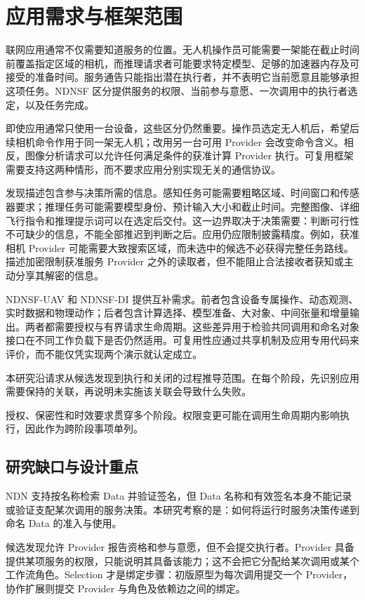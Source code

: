 \section{应用需求与框架范围}
联网应用通常不仅需要知道服务的位置。无人机操作员可能需要一架能在截止时间前覆盖指定区域的相机，而推理请求者可能要求特定模型、足够的加速器内存及可接受的准备时间。服务通告只能指出潜在执行者，并不表明它当前愿意且能够承担这项任务。NDNSF 区分提供服务的权限、当前参与意愿、一次调用中的执行者选定，以及任务完成。

即使应用通常只使用一台设备，这些区分仍然重要。操作员选定无人机后，希望后续相机命令作用于同一架无人机；改用另一台可用 Provider 会改变命令含义。相反，图像分析请求可以允许任何满足条件的获准计算 Provider 执行。可复用框架需要支持这两种情形，而不要求应用分别实现无关的通信协议。

发现描述包含参与决策所需的信息。感知任务可能需要粗略区域、时间窗口和传感器要求；推理任务可能需要模型身份、预计输入大小和截止时间。完整图像、详细飞行指令和推理提示词可以在选定后交付。这一边界取决于决策需要：判断可行性不可缺少的信息，不能全部推迟到判断之后。应用仍应限制披露精度。例如，获准相机 Provider 可能需要大致搜索区域，而未选中的候选不必获得完整任务路线。描述加密限制获准服务 Provider 之外的读取者，但不能阻止合法接收者获知或主动分享其解密的信息。

NDNSF-UAV 和 NDNSF-DI 提供互补需求。前者包含设备专属操作、动态观测、实时数据和物理动作；后者包含计算选择、模型准备、大对象、中间张量和增量输出。两者都需要授权与有界请求生命周期。这些差异用于检验共同调用和命名对象接口在不同工作负载下是否仍然适用。可复用性应通过共享机制及应用专用代码来评价，而不能仅凭实现两个演示就认定成立。

本研究沿请求从候选发现到执行和关闭的过程推导范围。在每个阶段，先识别应用需要保持的关联，再说明未实施该关联会导致什么失败。

授权、保密性和时效要求贯穿多个阶段。权限变更可能在调用生命周期内影响执行，因此作为跨阶段事项单列。

\subsection{研究缺口与设计重点}
NDN 支持按名称检索 Data 并验证签名，但 Data 名称和有效签名本身不能记录或验证支配某次调用的服务决策。本研究考察的是：如何将运行时服务决策传递到命名 Data 的准入与使用。

候选发现允许 Provider 报告资格和参与意愿，但不会提交执行者。Provider 具备提供某项服务的权限，只能说明其具备该能力；这不会把它分配给某次调用或某个工作流角色。Selection 才是绑定步骤：初版原型为每次调用提交一个 Provider，协作扩展则提交 Provider 与角色及依赖边之间的绑定。

